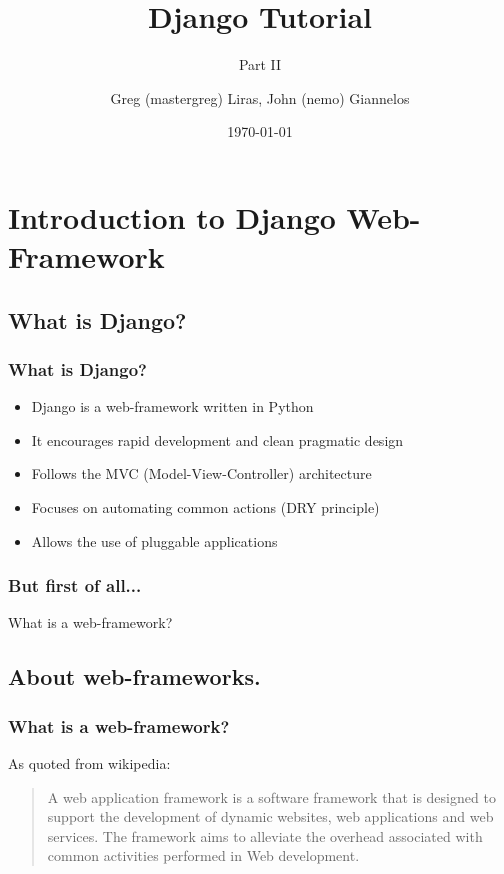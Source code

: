 \documentclass{beamer}
\author[nemo,mastergreg]{Greg (mastergreg) Liras, John (nemo) Giannelos}
\institute{foss.ntua}
\title{Django Tutorial}
\subtitle{Part II}
\date{\today}
\begin{document}
\begin{frame}
\titlepage
\end{frame}


\section{Introduction to Django Web-Framework}

\subsection{What is Django?}
\begin{frame}
  \frametitle{What is Django?}
\begin{itemize}[<+->]
  \item Django is a web-framework written in Python 
  \item It encourages rapid development and clean pragmatic design 
  \item Follows the MVC (Model-View-Controller) architecture
  \item Focuses on automating common actions (DRY principle) 
  \item Allows the use of pluggable applications
\end{itemize}
\end{frame}

\begin{frame}
  \frametitle{But first of all...}
What is a web-framework?
\end{frame}

\subsection{About web-frameworks.}

\begin{frame}
  \frametitle{What is a web-framework?}
As quoted from wikipedia:
\begin{quote}
A web application framework is a software framework that is designed to support the development of dynamic websites, web applications and web services. The framework aims to alleviate the overhead associated with common activities performed in Web development.
\end{quote}
\end{frame}
\end{document}
